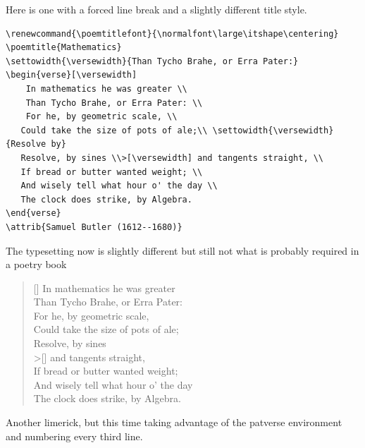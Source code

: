Here is one with a forced line break and a slightly different title style.

\begin{lstlisting}[language={[common]TeX},% 
                           alsolanguage={[LaTeX]TeX},% 
                           alsolanguage={[primitive]TeX},%
                           alsolanguage={extras}]
\renewcommand{\poemtitlefont}{\normalfont\large\itshape\centering}
\poemtitle{Mathematics}
\settowidth{\versewidth}{Than Tycho Brahe, or Erra Pater:}
\begin{verse}[\versewidth]
    In mathematics he was greater \\
    Than Tycho Brahe, or Erra Pater: \\
    For he, by geometric scale, \\
   Could take the size of pots of ale;\\ \settowidth{\versewidth}{Resolve by}
   Resolve, by sines \\>[\versewidth] and tangents straight, \\
   If bread or butter wanted weight; \\
   And wisely tell what hour o' the day \\
   The clock does strike, by Algebra.
\end{verse}
\attrib{Samuel Butler (1612--1680)}
\end{lstlisting}

The typesetting now is slightly different but still not what is probably required in a poetry book

\begin{verse}[\versewidth]
    In mathematics he was greater \\
    Than Tycho Brahe, or Erra Pater: \\
    For he, by geometric scale, \\
   Could take the size of pots of ale;\\ \settowidth{\versewidth}{Resolve by}
   Resolve, by sines \\>[\versewidth] and tangents straight, \\
   If bread or butter wanted weight; \\
   And wisely tell what hour o' the day \\
   The clock does strike, by Algebra.
\end{verse}
\bigskip


Another limerick, but this time taking advantage of the patverse environment
and numbering every third line.

